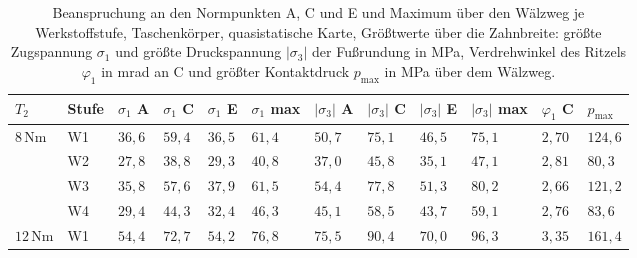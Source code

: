 \begin{table}[htbp]
	\caption{Beanspruchung an den Normpunkten A, C und E und Maximum über den Wälzweg je Werkstoffstufe, Taschenkörper, quasistatische Karte, Größtwerte über die Zahnbreite: größte Zugspannung $\sigma_{\mathrm{1}}$ und größte Druckspannung $|\sigma_{\mathrm{3}}|$ der Fußrundung in MPa, Verdrehwinkel des Ritzels $\varphi_{\mathrm{1}}$ in mrad an C und größter Kontaktdruck $p_{\mathrm{max}}$ in MPa über dem Wälzweg.}
	\label{tab:waelzweg_normpunkte}
	\centering
	\footnotesize
	\setlength{\tabcolsep}{4pt}
	\begin{tabular}{L{1.0cm}L{0.8cm}L{1.0cm}L{1.0cm}L{1.0cm}L{1.1cm}L{1.0cm}L{1.0cm}L{1.0cm}L{1.1cm}L{1.1cm}L{1.1cm}}
		$T_{2}$  & Stufe & $\sigma_{\mathrm{1}}$ A & $\sigma_{\mathrm{1}}$ C & $\sigma_{\mathrm{1}}$ E & $\sigma_{\mathrm{1}}$ max & $|\sigma_{\mathrm{3}}|$ A & $|\sigma_{\mathrm{3}}|$ C & $|\sigma_{\mathrm{3}}|$ E & $|\sigma_{\mathrm{3}}|$ max & $\varphi_{\mathrm{1}}$ C & $p_{\mathrm{max}}$ \\
		\hline
		$8$\,Nm  & W1    & $36{,}6$                & $59{,}4$                & $36{,}5$                & $61{,}4$                  & $50{,}7$                  & $75{,}1$                  & $46{,}5$                  & $75{,}1$                    & $2{,}70$                 & $124{,}6$          \\
		\hline
		         & W2    & $27{,}8$                & $38{,}8$                & $29{,}3$                & $40{,}8$                  & $37{,}0$                  & $45{,}8$                  & $35{,}1$                  & $47{,}1$                    & $2{,}81$                 & $80{,}3$           \\
		\hline
		         & W3    & $35{,}8$                & $57{,}6$                & $37{,}9$                & $61{,}5$                  & $54{,}4$                  & $77{,}8$                  & $51{,}3$                  & $80{,}2$                    & $2{,}66$                 & $121{,}2$          \\
		\hline
		         & W4    & $29{,}4$                & $44{,}3$                & $32{,}4$                & $46{,}3$                  & $45{,}1$                  & $58{,}5$                  & $43{,}7$                  & $59{,}1$                    & $2{,}76$                 & $83{,}6$           \\
		\hline
		$12$\,Nm & W1    & $54{,}4$                & $72{,}7$                & $54{,}2$                & $76{,}8$                  & $75{,}5$                  & $90{,}4$                  & $70{,}0$                  & $96{,}3$                    & $3{,}35$                 & $161{,}4$          \\

\end{tabular}
\end{table}
